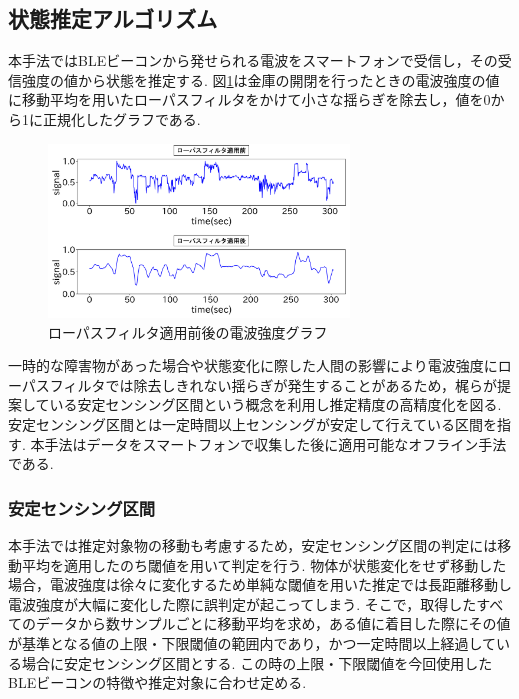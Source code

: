 \documentclass[Japanese]{dicomopapers}
\begin{document}

\subsection{状態推定アルゴリズム}
本手法ではBLEビーコンから発せられる電波をスマートフォンで受信し，その受信強度の値から状態を推定する.
図\ref{bank-opcl}は金庫の開閉を行ったときの電波強度の値に移動平均を用いたローパスフィルタをかけて小さな揺らぎを除去し，値を0から1に正規化したグラフである.

\begin{figure}[tbh]
 \centering
 \includegraphics[width=8cm]{lowpath_compare.png}
 \caption{ローパスフィルタ適用前後の電波強度グラフ}
 \label{bank-opcl}
\end{figure}


一時的な障害物があった場合や状態変化に際した人間の影響により電波強度にローパスフィルタでは除去しきれない揺らぎが発生することがあるため，梶ら\cite{sensing-area}が提案している安定センシング区間という概念を利用し推定精度の高精度化を図る.
安定センシング区間とは一定時間以上センシングが安定して行えている区間を指す.
本手法はデータをスマートフォンで収集した後に適用可能なオフライン手法である.


\subsubsection{安定センシング区間}
本手法では推定対象物の移動も考慮するため，安定センシング区間の判定には移動平均を適用したのち閾値を用いて判定を行う.
物体が状態変化をせず移動した場合，電波強度は徐々に変化するため単純な閾値を用いた推定では長距離移動し電波強度が大幅に変化した際に誤判定が起こってしまう.
そこで，取得したすべてのデータから数サンプルごとに移動平均を求め，ある値に着目した際にその値が基準となる値の上限・下限閾値の範囲内であり，かつ一定時間以上経過している場合に安定センシング区間とする.
この時の上限・下限閾値を今回使用したBLEビーコンの特徴や推定対象に合わせ定める.
\end{document}
